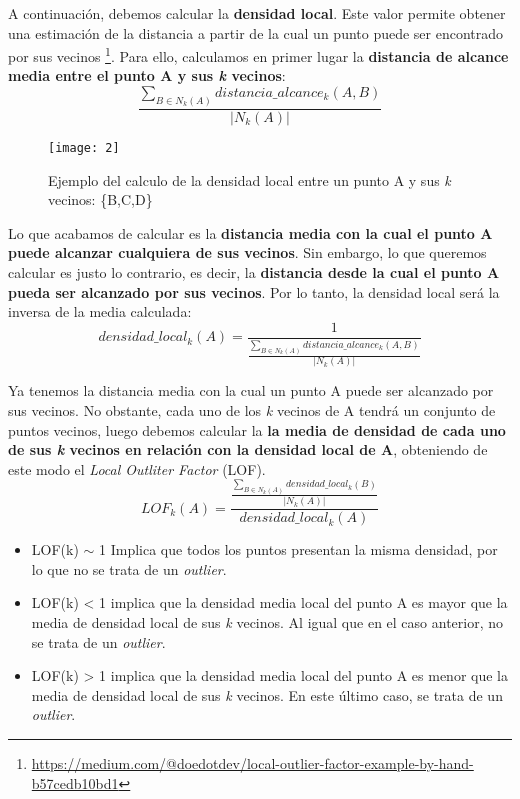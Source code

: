 \documentclass [a4paper] {article}
\begin{document}
A continuación, debemos calcular la \textbf{densidad local}. Este valor permite obtener una estimación de la distancia a partir de la cual un punto puede ser encontrado por sus vecinos \footnote{\url{https://medium.com/@doedotdev/local-outlier-factor-example-by-hand-b57cedb10bd1}}. Para ello, calculamos en primer lugar la \textbf{distancia de alcance media entre el punto A y sus \textit{k} vecinos}:
\begin{equation*}
\frac{\sum_{B \in N_{k}(A)}distancia\_alcance_{k}(A,B)}{|N_{k}(A)|}
\end{equation*}

\begin{figure}[h!]
\centering
\texttt{[image: 2]}
\caption{Ejemplo del calculo de la densidad local entre un punto A y sus \textit{k} vecinos: \{B,C,D\}}
\end{figure}

Lo que acabamos de calcular es la \textbf{distancia media con la cual el punto A puede alcanzar cualquiera de sus vecinos}. Sin embargo, lo que queremos calcular es justo lo contrario, es decir, la \textbf{distancia desde la cual el punto A pueda ser alcanzado por sus vecinos}. Por lo tanto, la densidad local será la inversa de la media calculada:
\begin{equation*}
densidad\_local_{k}(A) = \frac{1}{\frac{\sum_{B \in N_{k}(A)}distancia\_alcance_{k}(A,B)}{|N_{k}(A)|}}
\end{equation*}

Ya tenemos la distancia media con la cual un punto A puede ser alcanzado por sus vecinos. No obstante, cada uno de los \textit{k} vecinos de A tendrá un conjunto de puntos vecinos, luego debemos calcular la \textbf{la media de densidad de cada uno de sus \textit{k} vecinos en relación con la densidad local de A}, obteniendo de este modo el \textit{Local Outliter Factor} (LOF).
\begin{equation*}
LOF_{k}(A) = \frac{\frac{\sum_{B \in N_{k}(A)}densidad\_local_{k}(B)}{|N_{k}(A)|}}{densidad\_local_{k}(A)}
\end{equation*}
\begin{itemize}
  \item LOF(k) $\sim$ 1 Implica que todos los puntos presentan la misma densidad, por lo que no se trata de un \textit{outlier}.
  \item LOF(k) < 1 implica que la densidad media local del punto A es mayor que la media de densidad local de sus \textit{k} vecinos. Al igual que en el caso anterior, no se trata de un \textit{outlier}.
  \item LOF(k) > 1 implica que la densidad media local del punto A es menor que la media de densidad local de sus \textit{k} vecinos. En este último caso, se trata de un \textit{outlier}.
\end{itemize}
\end{document}
